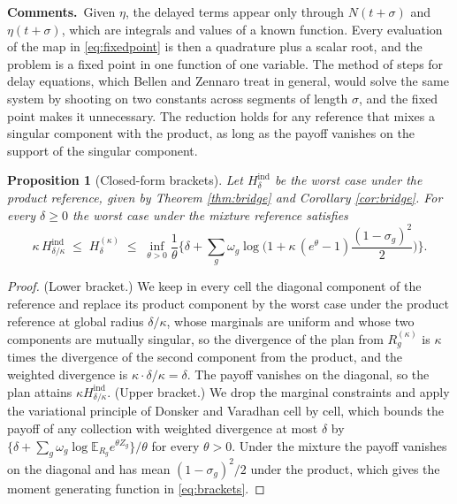 \documentclass[11pt,a4paper]{article}
\theoremstyle{notesplain}
\newtheorem{proposition}[theorem]{Proposition}
\theoremstyle{notesupright}
\numberwithin{equation}{section}
\newcommand{\comments}{\par\smallskip\noindent\textbf{Comments.}\ }
\newcommand{\E}{\mathbb{E}}
\begin{document}
\comments Given $\eta$, the delayed terms appear only through $N(t+\sigma)$ and $\eta(t+\sigma)$, which are integrals and values of a known function. Every evaluation of the map in \eqref{eq:fixedpoint} is then a quadrature plus a scalar root, and the problem is a fixed point in one function of one variable. The method of steps for delay equations, which Bellen and Zennaro \cite{bellenzennaro} treat in general, would solve the same system by shooting on two constants across segments of length $\sigma$, and the fixed point makes it unnecessary. The reduction holds for any reference that mixes a singular component with the product, as long as the payoff vanishes on the support of the singular component.

\begin{proposition}[Closed-form brackets]
\label{prop:brackets}
Let $H^{\mathrm{ind}}_\delta$ be the worst case under the product reference, given by Theorem \ref{thm:bridge} and Corollary \ref{cor:bridge}. For every $\delta\ge0$ the worst case under the mixture reference satisfies
\begin{equation}
\kappa\,H^{\mathrm{ind}}_{\delta/\kappa}\;\le\;H^{(\kappa)}_\delta\;\le\;\inf_{\theta>0}\frac1\theta\Big\{\delta+\sum_g\omega_g\log\Big(1+\kappa\,(e^\theta-1)\frac{(1-\sigma_g)^2}2\Big)\Big\}.
\label{eq:brackets}
\end{equation}
\end{proposition}

\begin{proof}
(Lower bracket.) We keep in every cell the diagonal component of the reference and replace its product component by the worst case under the product reference at global radius $\delta/\kappa$, whose marginals are uniform and whose two components are mutually singular, so the divergence of the plan from $R^{(\kappa)}_g$ is $\kappa$ times the divergence of the second component from the product, and the weighted divergence is $\kappa\cdot\delta/\kappa=\delta$. The payoff vanishes on the diagonal, so the plan attains $\kappa H^{\mathrm{ind}}_{\delta/\kappa}$. (Upper bracket.) We drop the marginal constraints and apply the variational principle of Donsker and Varadhan cell by cell, which bounds the payoff of any collection with weighted divergence at most $\delta$ by $\{\delta+\sum_g\omega_g\log\E_{R_g}e^{\theta Z_g}\}/\theta$ for every $\theta>0$. Under the mixture the payoff vanishes on the diagonal and has mean $(1-\sigma_g)^2/2$ under the product, which gives the moment generating function in \eqref{eq:brackets}.
\end{proof}
\end{document}
